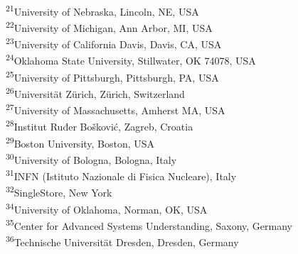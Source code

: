 \documentclass[twocolumn]{svjour3}          %
\newcommand*{\affaddr}[1]{#1} %
\newcommand*{\affmark}[1][*]{\textsuperscript{#1}}
\begin{document}
{\affaddr{\affmark[21]University of Nebraska, Lincoln, NE, USA }\\
\affaddr{\affmark[22]University of Michigan, Ann Arbor, MI, USA }\\
\affaddr{\affmark[23]University of California Davis, Davis, CA, USA }\\
\affaddr{\affmark[24]Oklahoma State University, Stillwater, OK 74078, USA }\\
\affaddr{\affmark[25]University of Pittsburgh, Pittsburgh, PA, USA }\\
\affaddr{\affmark[26]Universität Zürich, Zürich, Switzerland }\\
\affaddr{\affmark[27]University of Massachusetts, Amherst MA, USA }\\
\affaddr{\affmark[28]Institut Ruđer Bo\v skovi\' c, Zagreb, Croatia }\\
\affaddr{\affmark[29]Boston University, Boston, USA }\\
\affaddr{\affmark[30]University of Bologna, Bologna, Italy }\\
\affaddr{\affmark[31]INFN (Istituto Nazionale di Fisica Nucleare), Italy }\\
\affaddr{\affmark[32]SingleStore, New York}\\
\affaddr{\affmark[34]University of Oklahoma, Norman, OK, USA } \\
\affaddr{\affmark[35]Center for Advanced Systems Understanding, Saxony, Germany}\\
\affaddr{\affmark[36]Technische Universität Dresden, Dresden, Germany }\\
}





%
%

\end{document}
